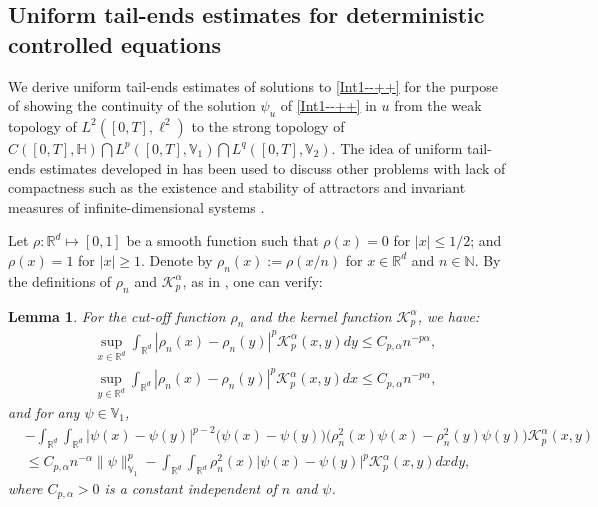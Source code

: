 \documentclass[11pt]{article}
\renewcommand{\leq}{\leqslant}
\renewcommand{\geq}{\geqslant}  %
\newtheorem{lemma}[theorem]{Lemma}
\numberwithin{equation}{section}
\begin{document}
\subsection{Uniform tail-ends estimates for deterministic controlled equations}
We derive uniform
tail-ends estimates of solutions to
\eqref{Int1--++} for the purpose of showing
the continuity of the solution $\psi_u$ of \eqref{Int1--++} in $u$
from the weak topology of
$L^2([0,T],\ell^2)$ to the strong topology of  $C([0,T],\mathbb{H} )\bigcap L^p([0,T], \mathbb{V}_1  ) \bigcap L^q([0,T], \mathbb{V}_2)$. The idea of uniform tail-ends estimates developed in \cite{Wangphysd} has
been used to discuss other problems with lack of compactness such as the existence and stability of attractors and invariant measures
 of infinite-dimensional systems
 \cite{chenp0, Chenpa,Caraballo4,
Gu2018jde,Kinra24,LIding1,Wang2011Tran,wangjfa,
wangjde2019,WangGUOWANG,Wang-wangb,
Wang-wangb2}.

Let $\rho:\mathbb{R}^d\mapsto[0,1]$ be a smooth function such that
$\rho(x)=0$ for $|x|\leq1/2$; and
$\rho(x)=1$ for $|x|\geq1$. Denote by $\rho_n(x):=\rho(x/n)$ for $x\in\mathbb{R}^d$ and $n\in\mathbb{N}$.
By
the definitions of $\rho_n$ and $\mathcal{K}_{p}^\alpha$, as in \cite{Wang-wangb,Wang-wangb2,RWangsubmitted},
one can verify:

\begin{lemma}\label{Prpgiikgk.jkj}
For the cut-off function $\rho_n$ and the kernel function
$\mathcal{K}_{p}^\alpha$, we have:
\begin{align*}&
\sup_{x\in\mathbb{R}^d}\int_{\mathbb{R}^d}
|\rho_n(x)-
\rho_n(y)|^p
\mathcal{K}_{p}^\alpha(x,y)dy\leq
C_{p,\alpha}n^{-p\alpha},
\\&\sup_{y\in\mathbb{R}^d}
\int_{\mathbb{R}^d}|\rho_n(x)
-\rho_n(y)|^p
\mathcal{K}_{p}^\alpha(x,y)dx\leq C_{p,\alpha}n^{-p\alpha},
\end{align*}
and for any $\psi\in\mathbb{V}_1$,
\begin{align*}&
-\int_{\mathbb{R}^d}\int_{\mathbb{R}^d}
|\psi(x)-\psi(y)|^{p-2}\big
(\psi(x)-\psi(y)\big)
\big(\rho^2_n(x)\psi(x)-
\rho^2_n(y)\psi(y)\big)
\mathcal{K}_p^\alpha(x,y)
\\&\leq C_{p,\alpha}
n^{-\alpha}
\|\psi\|^{p
}_{\mathbb{V}_1}
-\int_{\mathbb{R}^d}\int_{\mathbb{R}^d}
\rho^2_n(x)|\psi(x)-\psi(y)|^{p}
\mathcal{K}_p^\alpha(x,y)
 dxdy,\end{align*}
where $C_{p,\alpha}>0$ is a constant independent of $n$ and $\psi$.
\end{lemma}
\end{document}
